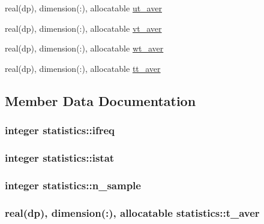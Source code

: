 \begin{DoxyCompactItemize}
\item 
real(dp), dimension(\-:), allocatable \hyperlink{classstatistics_aa2089819b01b5d358101abf20ac5789a}{ut\-\_\-aver}
\item 
real(dp), dimension(\-:), allocatable \hyperlink{classstatistics_a5ae297f67d308ec03226af19b4aff209}{vt\-\_\-aver}
\item 
real(dp), dimension(\-:), allocatable \hyperlink{classstatistics_aaee710726ddb4e229fff6b5565760bad}{wt\-\_\-aver}
\item 
real(dp), dimension(\-:), allocatable \hyperlink{classstatistics_adb9d6ed22dab363f8eff806214d98e3a}{tt\-\_\-aver}
\end{DoxyCompactItemize}


\subsection{Member Data Documentation}
\hypertarget{classstatistics_afbce262b53b0ec9ab17f770682b7fb35}{
\subsubsection[{ifreq}]{\setlength{\rightskip}{0pt plus 5cm}integer statistics\-::ifreq}}\label{classstatistics_afbce262b53b0ec9ab17f770682b7fb35}
\hypertarget{classstatistics_ac0feba651e4213ecd0425b1c5a0de80a}{
\subsubsection[{istat}]{\setlength{\rightskip}{0pt plus 5cm}integer statistics\-::istat}}\label{classstatistics_ac0feba651e4213ecd0425b1c5a0de80a}
\hypertarget{classstatistics_a485020773672b32291040ca0044fff27}{
\subsubsection[{n\-\_\-sample}]{\setlength{\rightskip}{0pt plus 5cm}integer statistics\-::n\-\_\-sample}}\label{classstatistics_a485020773672b32291040ca0044fff27}
\hypertarget{classstatistics_a19932dbbd083f997879d6ed14d486428}{
\subsubsection[{t\-\_\-aver}]{\setlength{\rightskip}{0pt plus 5cm}real(dp), dimension(\-:), allocatable statistics\-::t\-\_\-aver}}\label{classstatistics_a19932dbbd083f997879d6ed14d486428}

